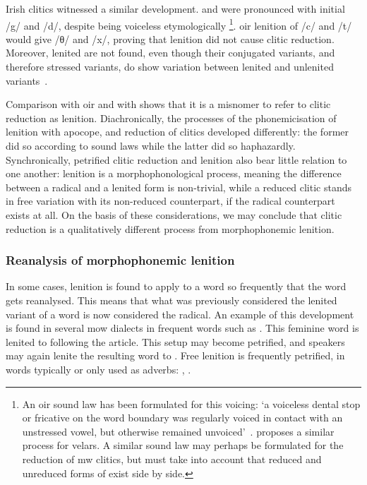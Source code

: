 Irish clitics witnessed a similar development.  
 and  were pronounced with initial /g/ and /d/, despite being voiceless etymologically%
\footnote{An \gls{oir} sound law has been formulated for this voicing: `a voiceless dental stop or fricative on the word boundary was regularly voiced in contact with an unstressed vowel, but otherwise remained unvoiced'~\autocite[42]{mccone_final_1981}. 
\Textcite[43]{jongeleen_lenition_2016} proposes a similar process for velars.
A similar sound law may perhaps be formulated for the reduction of \gls{mw} clitics, but must take into account that reduced and unreduced forms of \eg {} exist side by side.}.
\Gls{oir} lenition of /c/ and /t/ would give /θ/ and /x/, proving that lenition did not cause clitic reduction.
Moreover, lenited  are not found, even though their conjugated variants, and therefore stressed variants, do show variation between lenited and unlenited variants~\autocite[43]{jongeleen_lenition_2016}.

Comparison with \gls{oir} and with  shows that it is a misnomer to refer to clitic reduction as lenition.
Diachronically, the processes of the phonemicisation of lenition with apocope, and reduction of clitics developed differently: the former did so according to sound laws while the latter did so haphazardly.
Synchronically, petrified clitic reduction and lenition also bear little relation to one another: lenition is a morphophonological process, meaning the difference between a radical and a lenited form is non-trivial, while a reduced clitic stands in free variation with its non-reduced counterpart, if the radical counterpart exists at all. 
On the basis of these considerations, we may conclude that clitic reduction is a qualitatively different process from morphophonemic lenition. 

\subsubsection{Reanalysis of morphophonemic lenition}
In some cases, lenition is found to apply to a word so frequently that the word gets reanalysed. 
This means that what was previously considered the lenited variant of a word is now considered the radical. 
An example of this development is found in several \gls{mow} dialects in frequent words such as . 
This feminine word is lenited to  following the article. 
This setup may become petrified, and speakers may again lenite the resulting word to .
Free lenition is frequently petrified, \eg in words typically or only used as adverbs: , .


